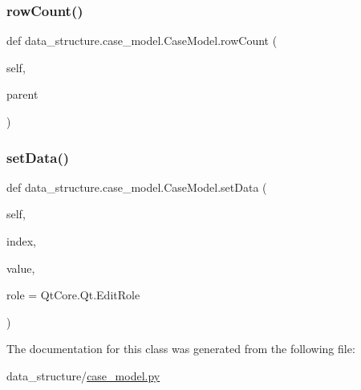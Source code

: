 \hypertarget{a00082_a44b390eef57be2a4883c1e6599b5a8ca}{}\label{a00082_a44b390eef57be2a4883c1e6599b5a8ca} 
\subsubsection{\texorpdfstring{row\+Count()}{rowCount()}}
{\footnotesize\ttfamily def data\+\_\+structure.\+case\+\_\+model.\+Case\+Model.\+row\+Count (\begin{DoxyParamCaption}\item[{}]{self,  }\item[{}]{parent }\end{DoxyParamCaption})}

\hypertarget{a00082_a9d7790fb94587e15b2c1b77a01e7845c}{}\label{a00082_a9d7790fb94587e15b2c1b77a01e7845c} 
\subsubsection{\texorpdfstring{set\+Data()}{setData()}}
{\footnotesize\ttfamily def data\+\_\+structure.\+case\+\_\+model.\+Case\+Model.\+set\+Data (\begin{DoxyParamCaption}\item[{}]{self,  }\item[{}]{index,  }\item[{}]{value,  }\item[{}]{role = {\ttfamily QtCore.Qt.EditRole} }\end{DoxyParamCaption})}



The documentation for this class was generated from the following file\+:\begin{DoxyCompactItemize}
\item 
data\+\_\+structure/\hyperlink{a00014}{case\+\_\+model.\+py}\end{DoxyCompactItemize}
